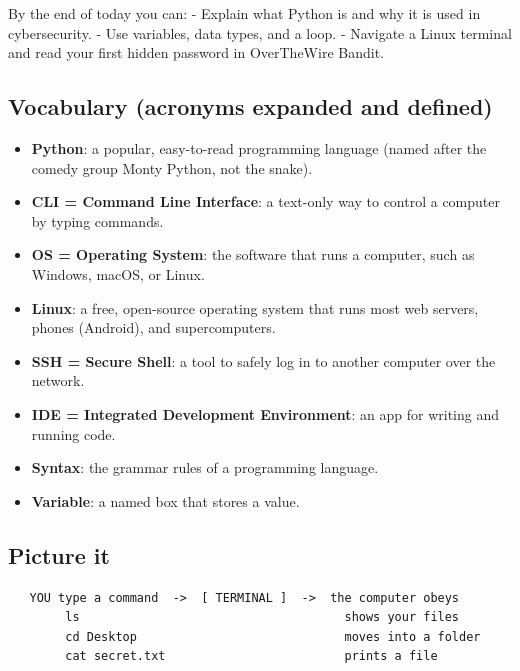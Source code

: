 \documentclass[12pt,openany]{book}
\begin{document}
By the end of today you can:
- Explain what Python is and why it is used in cybersecurity.
- Use variables, data types, and a loop.
- Navigate a Linux terminal and read your first hidden password in OverTheWire Bandit.

\medskip

\subsection*{Vocabulary (acronyms expanded and defined)}


\begin{itemize}

  \item \textbf{Python}: a popular, easy-to-read programming language (named after the comedy group Monty Python, not the snake).

  \item \textbf{CLI = Command Line Interface}: a text-only way to control a computer by typing commands.

  \item \textbf{OS = Operating System}: the software that runs a computer, such as Windows, macOS, or Linux.

  \item \textbf{Linux}: a free, open-source operating system that runs most web servers, phones (Android), and supercomputers.

  \item \textbf{SSH = Secure Shell}: a tool to safely log in to another computer over the network.

  \item \textbf{IDE = Integrated Development Environment}: an app for writing and running code.

  \item \textbf{Syntax}: the grammar rules of a programming language.

  \item \textbf{Variable}: a named box that stores a value.

\end{itemize}

\medskip

\subsection*{Picture it}


\begin{lstlisting}
   YOU type a command  ->  [ TERMINAL ]  ->  the computer obeys
        ls                                     shows your files
        cd Desktop                             moves into a folder
        cat secret.txt                         prints a file
\end{lstlisting}
\end{document}
